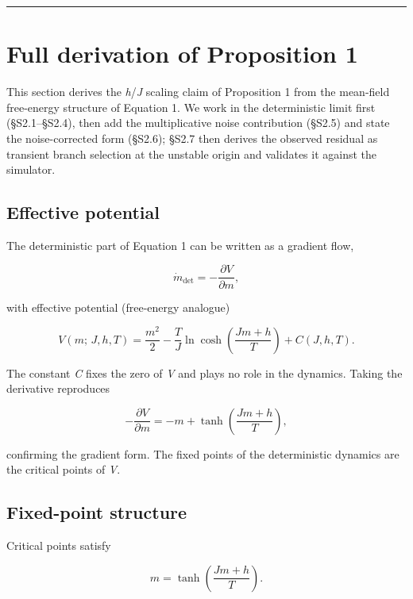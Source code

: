 \documentclass[11pt,letterpaper]{article}
\begin{document}
\begin{center}\rule{0.5\linewidth}{0.5pt}\end{center}

\section{Full derivation of Proposition 1}\label{full-derivation-of-proposition-1}

This section derives the \emph{h}/\emph{J} scaling claim of Proposition 1 from the mean-field free-energy structure of Equation 1. We work in the deterministic limit first (§S2.1--§S2.4), then add the multiplicative noise contribution (§S2.5) and state the noise-corrected form (§S2.6); §S2.7 then derives the observed residual as transient branch selection at the unstable origin and validates it against the simulator.

\subsection{Effective potential}\label{effective-potential}

The deterministic part of Equation 1 can be written as a gradient flow,

\[
\dot m_{\mathrm{det}} = -\frac{\partial V}{\partial m},
\]

with effective potential (free-energy analogue)

\[
V(m;\,J,h,T) = \frac{m^2}{2} - \frac{T}{J}\ln\cosh\!\left(\frac{Jm + h}{T}\right) + C(J, h, T).
\]

The constant \emph{C} fixes the zero of \emph{V} and plays no role in the dynamics. Taking the derivative reproduces

\[
-\frac{\partial V}{\partial m} = -m + \tanh\!\left(\frac{Jm + h}{T}\right),
\]

confirming the gradient form. The fixed points of the deterministic dynamics are the critical points of \emph{V}.

\subsection{Fixed-point structure}\label{fixed-point-structure}

Critical points satisfy


\begin{equation*}
m = \tanh\!\left(\frac{Jm + h}{T}\right). \tag{S1}
\end{equation*}
\end{document}
